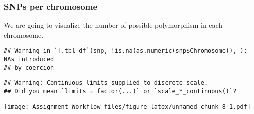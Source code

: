 \documentclass[
]{article}
\newenvironment{Shaded}{\begin{snugshade}}{\end{snugshade}}
\newcommand{\AttributeTok}[1]{\textcolor[rgb]{0.77,0.63,0.00}{#1}}
\newcommand{\DecValTok}[1]{\textcolor[rgb]{0.00,0.00,0.81}{#1}}
\newcommand{\FunctionTok}[1]{\textcolor[rgb]{0.00,0.00,0.00}{#1}}
\newcommand{\NormalTok}[1]{#1}
\newcommand{\SpecialCharTok}[1]{\textcolor[rgb]{0.00,0.00,0.00}{#1}}
\newcommand{\StringTok}[1]{\textcolor[rgb]{0.31,0.60,0.02}{#1}}
\begin{document}
\hypertarget{snps-per-chromosome}{%
\subsubsection{SNPs per chromosome}\label{snps-per-chromosome}}

We are going to visualize the number of possible polymorphism in each
chromosome.

\begin{Shaded}
\end{Shaded}

\begin{verbatim}
## Warning in `[.tbl_df`(snp, !is.na(as.numeric(snp$Chromosome)), ): NAs introduced
## by coercion
\end{verbatim}

\begin{verbatim}
## Warning: Continuous limits supplied to discrete scale.
## Did you mean `limits = factor(...)` or `scale_*_continuous()`?
\end{verbatim}

\texttt{[image: Assignment-Workflow\_files/figure-latex/unnamed-chunk-8-1.pdf]}
\end{document}
